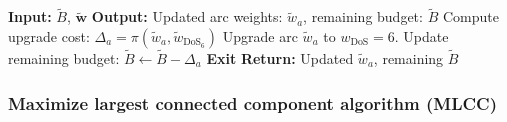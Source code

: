 \documentclass[letterpaper, 10 pt, conference]{ieeeconf}  %
\begin{document}
\begin{algorithm}[H]
\caption{GAB}
\label{pseudocode:GAB}
\footnotesize
\begin{algorithmic}[1]
\State \textbf{Input:} $\tilde{B}$, $\tilde{\mathbf{w}}$
\State \textbf{Output:} Updated arc weights: $\tilde{w}_{a}$, remaining budget: $\tilde{B}$
    \State Compute upgrade cost: $\Delta_a = \pi(\tilde{w}_a, \tilde{w}_{\text{DoS}_6})$
        \State Upgrade arc $\tilde{w}_{a}$ to $w_{\text{DoS}} = 6$.
        \State Update remaining budget: $\tilde{B} \gets \tilde{B} - \Delta_a$
    \EndIf
        \State \textbf{Exit}
    \EndIf
\EndFor
\State \textbf{Return:} Updated $\tilde{w}_a$, remaining $\tilde{B}$
\end{algorithmic}
\end{algorithm}

\subsubsection{Maximize largest connected component algorithm (MLCC)}
\end{document}
